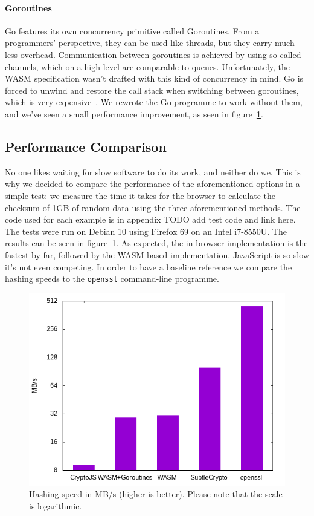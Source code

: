 \paragraph{Goroutines} Go features its own concurrency primitive called Goroutines.
From a programmers' perspective, they can be used like threads, but they carry much less overhead.
Communication between goroutines is achieved by using so-called channels, which on a high level are comparable to queues.
Unfortunately, the \gls{WASM} specification wasn't drafted with this kind of concurrency in mind.
Go is forced to unwind and restore the call stack when switching between goroutines, which is very expensive~\cite{lolnogoroutines}.
We rewrote the Go programme to work without them, and we've seen a small performance improvement, as seen in figure~\ref{fig:hashingperformance}.





\subsection{Performance Comparison}
\label{subsec:perfcomphashing}
No one likes waiting for slow software to do its work, and neither do we.
This is why we decided to compare the performance of the aforementioned options in a simple test:
we measure the time it takes for the browser to calculate the checksum of 1GB of random data using the three aforementioned methods.
The code used for each example is in appendix TODO add test code and link here.
The tests were run on Debian 10 using Firefox 69 on an Intel i7-8550U.
The results can be seen in figure~\ref{fig:hashingperformance}.
As expected, the in-browser implementation is the fastest by far, followed by the \gls{WASM}-based implementation.
JavaScript is so slow it's not even competing.
In order to have a baseline reference we compare the hashing speeds to the \texttt{openssl} command-line programme.

\begin{figure}
    \begin{center}
        \includegraphics[width=0.7\linewidth]{images/hashingperformance.png}
        \caption{Hashing speed in MB/s (higher is better). Please note that the scale is logarithmic.}
        \label{fig:hashingperformance}
    \end{center}
\end{figure}


